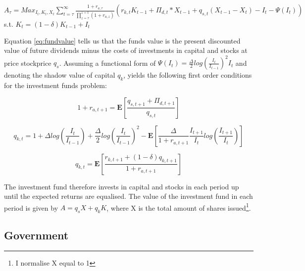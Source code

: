 \documentclass[12pt]{article}
\begin{document}
$A_{\tau}=Max_{I_{t},K_{t},X_{t}}\sum_{t=\tau}^{\infty}  \frac{1+r_{a,\tau}}{\prod_{z=\tau}^{z=t}(1+r_{a,z})}  
\left( r_{k,t} K_{t-1}+\Pi_{d,t}*X_{t-1}+q_{s,t}(X_{t-1}-X_{t}) - I_{t} - \Psi(I_{t}) \right)$ \\
s.t. \hspace{3mm} $K_{t}=(1-\delta)K_{t-1}+I_{t}$ \\
\begin{equation}\label{eq:fundvalue}
\end{equation}

Equation \ref{eq:fundvalue} tells us that the funds value is the present discounted value of future dividends minus the costs of investments in capital and stocks at price stockprice $q_s$. Assuming a functional form of $\Psi(I_{t})=\frac{\Delta}{2}log(\frac{I_t}{I_{t-1}})^2I_{t}$ and denoting the shadow value of capital $q_k$, yields the following first order conditions for the investment funds problem:

\begin{equation}
    1+r_{a,t+1}=\mathbf{E}\left[\frac{q_{s,t+1}+\Pi_{d,t+1}}{q_{s,t}}\right]
    \label{eq:inv1}
\end{equation}

\begin{equation}
q_{k,t}=1+\Delta log(\frac{I_t}{I_{t-1}})+\frac{\Delta}{2}log(\frac{I_t}{I_{t-1}})^2- \mathbf{E}\left[\frac{\Delta}{1+r_{a,t+1}}\frac{I_{t+1}}{I_{t}}log(\frac{I_{t+1}}{I_{t}})\right]
\label{eq:inv2}
\end{equation}

\begin{equation}
q_{k,t}=\mathbf{E}\left[\frac{r_{k,t+1}+(1-\delta)q_{k,t+1}}{1+r_{a,t+1}}\right] 
\label{eq:inv3}
\end{equation}

The investment fund therefore invests in capital and stocks in each period up until the expected returns are equalised. The value of the investment fund in each period is given by $A=q_{s}X+q_{k}K$, where X is the total amount of shares issued\footnote{I normalise X equal to 1}. 

\subsection{Government}
\end{document}

